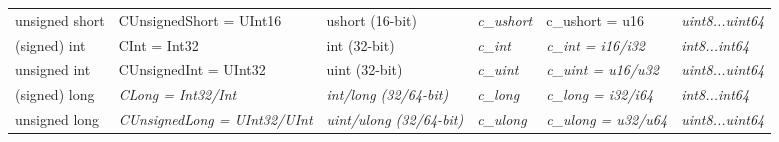 \begin{table}[]
\begin{adjustwidth}{-3cm}{}
\begin{tabular}{
>{\columncolor[HTML]{D9D9D9}}l lllll}
unsigned short                                                            & CUnsignedShort = UInt16                                                 & ushort (16-bit)                                                                        & \cellcolor[HTML]{CFE2F3}\textit{c\_ushort}                                   & c\_ushort = u16                                                                                                                                                      & \cellcolor[HTML]{CFE2F3}\textit{uint8...uint64}                       \\ 
(signed) int                                                              & CInt = Int32                                                            & int (32-bit)                                                                           & \cellcolor[HTML]{CFE2F3}\textit{c\_int}                                      & \cellcolor[HTML]{CFE2F3}\textit{c\_int = i16/i32}                                                                                                                  & \cellcolor[HTML]{CFE2F3}\textit{int8...int64}                         \\
unsigned int                                                              & CUnsignedInt = UInt32                                                   & uint (32-bit)                                                                          & \cellcolor[HTML]{CFE2F3}\textit{c\_uint}                                     & \cellcolor[HTML]{CFE2F3}\textit{c\_uint = u16/u32}                                                                                                                 & \cellcolor[HTML]{CFE2F3}\textit{uint8...uint64}                       \\
(signed) long                                                             & \cellcolor[HTML]{CFE2F3}\textit{CLong = Int32/Int}                      & \cellcolor[HTML]{CFE2F3}\textit{int/long (32/64-bit)}                       & \cellcolor[HTML]{CFE2F3}\textit{c\_long}                                     & \cellcolor[HTML]{CFE2F3}\textit{c\_long = i32/i64}                                                                                                                 & \cellcolor[HTML]{CFE2F3}\textit{int8...int64}                         \\
unsigned long                                                             & \cellcolor[HTML]{CFE2F3}\textit{CUnsignedLong = UInt32/UInt}            & \cellcolor[HTML]{CFE2F3}\textit{uint/ulong (32/64-bit)}                       & \cellcolor[HTML]{CFE2F3}\textit{c\_ulong}                                    & \cellcolor[HTML]{CFE2F3}\textit{c\_ulong = u32/u64}                                                                                                                & \cellcolor[HTML]{CFE2F3}\textit{uint8...uint64}                       \\

\end{tabular}
\end{adjustwidth}
\end{table}

